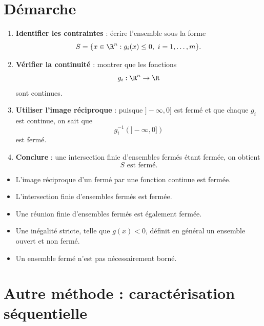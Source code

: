 
\section{Démarche}

\begin{methode}
\begin{enumerate}[label=\textbf{Étape \arabic*.}]
    \item \textbf{Identifier les contraintes} : écrire l'ensemble sous la forme
    \[
    S=\{x\in\R^n:g_i(x)\leq 0,\ i=1,\ldots,m\}.
    \]

    \item \textbf{Vérifier la continuité} : montrer que les fonctions
    \[
    g_i:\R^n\to\R
    \]
    sont continues.

    \item \textbf{Utiliser l'image réciproque} : puisque $]-\infty,0]$ est fermé et que chaque $g_i$ est continue, on sait que
    \[
    g_i^{-1}(]-\infty,0])
    \]
    est fermé.

    \item \textbf{Conclure} : une intersection finie d'ensembles fermés étant fermée, on obtient
    \[
    \boxed{S\text{ est fermé}.}
    \]
\end{enumerate}
\end{methode}

\begin{attention}
\begin{itemize}
    \item L'image réciproque d'un fermé par une fonction continue est fermée.
    \item L'intersection finie d'ensembles fermés est fermée.
    \item Une réunion finie d'ensembles fermés est également fermée.
    \item Une inégalité stricte, telle que $g(x)<0$, définit en général un ensemble ouvert et non fermé.
    \item Un ensemble fermé n'est pas nécessairement borné.
\end{itemize}
\end{attention}

\section{Autre méthode : caractérisation séquentielle}

